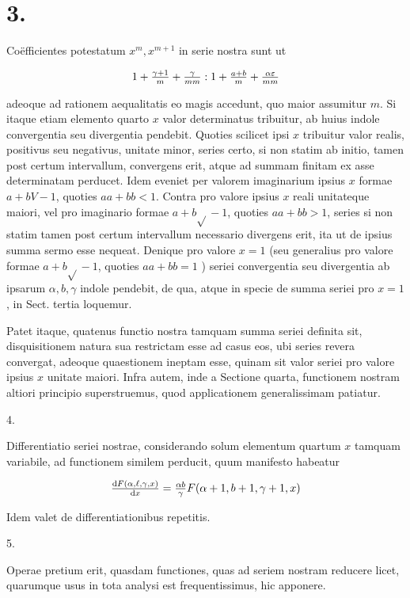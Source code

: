 \documentclass[twoside,12pt, showframe]{memoir}
\let\oldfrac\frac
\def\frac#1#2{\mathchoice{\tfrac{#1}{#2}}{\oldfrac{#1}{#2}}{\genfrac{}{}{}{2}{#1}{#2\mathstrut}}{\genfrac{}{}{}{3}{#1}{#2\mathstrut}}}
\begin{document}
\section*{3.}
Coëfficientes potestatum \(x^{m}, x^{m+1}\) in serie nostra sunt ut

\[
1+\frac{\gamma+1}{m}+\frac{\gamma}{m m}: 1+\frac{a+b}{m}+\frac{\alpha \varepsilon}{m m}
\]

adeoque ad rationem aequalitatis eo magis accedunt, quo maior assumitur \(m\). Si itaque etiam elemento quarto \(x\) valor determinatus tribuitur, ab huius indole convergentia seu divergentia pendebit. Quoties scilicet ipsi \(x\) tribuitur valor realis, positivus seu negativus, unitate minor, series certo, si non statim ab initio, tamen post certum intervallum, convergens erit, atque ad summam finitam ex asse determinatam perducet. Idem eveniet per valorem imaginarium ipsius \(x\) formae \(a+b V-1\), quoties \(a a+b b<1\). Contra pro valore ipsius \(x\) reali unitateque maiori, vel pro imaginario formae \(a+b \sqrt{ }-1\), quoties \(a a+b b>1\), series si non statim tamen post certum intervallum necessario divergens erit, ita ut de ipsius summa sermo esse nequeat. Denique pro valore \(x=1\) (seu generalius pro valore formae \(a+b \sqrt{ }-1\), quoties \(a a+b b=1\) ) seriei convergentia seu divergentia ab ipsarum \(\alpha, b, \gamma\) indole pendebit, de qua, atque in specie de summa seriei pro \(x=1\), in Sect. tertia loquemur.

Patet itaque, quatenus functio nostra tamquam summa seriei definita sit, disquisitionem natura sua restrictam esse ad casus eos, ubi series revera convergat, adeoque quaestionem ineptam esse, quinam sit valor seriei pro valore ipsius \(x\) unitate maiori. Infra autem, inde a Sectione quarta, functionem nostram altiori principio superstruemus, quod applicationem generalissimam patiatur.

4.

Differentiatio seriei nostrae, considerando solum elementum quartum \(x\) tamquam variabile, ad functionem similem perducit, quum manifesto habeatur

\[
\frac{\mathrm{d} F(\alpha, \ell, \gamma, x)}{\mathrm{d} x}=\frac{\alpha b}{\gamma} F(\alpha+1, b+1, \gamma+1, x)
\]

Idem valet de differentiationibus repetitis.

5.

Operae pretium erit, quasdam functiones, quas ad seriem nostram reducere licet, quarumque usus in tota analysi est frequentissimus, hic apponere.
\end{document}
